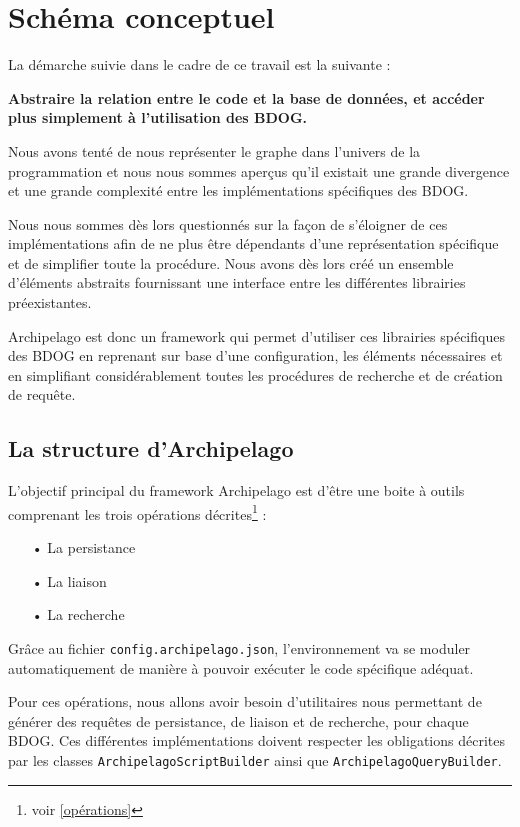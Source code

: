 \documentclass[a4paper,fleqn,12pt,oneside]{book}
\begin{document}

\newpage


\section{Schéma conceptuel}

La démarche suivie dans le cadre de ce travail est la suivante :

\begin{center}
\textbf{Abstraire la relation entre le code et la base de données, et accéder plus simplement à l’utilisation des BDOG. }
\end{center} 

Nous avons tenté de nous représenter le graphe dans l'univers de la programmation et nous nous sommes aperçus qu'il existait une grande divergence et une grande complexité entre les implémentations spécifiques des BDOG.

Nous nous sommes dès lors questionnés sur la façon de s'éloigner de ces implémentations afin de ne plus être dépendants d'une représentation spécifique et de simplifier toute la procédure. Nous avons dès lors créé un ensemble d'éléments abstraits fournissant une interface entre les différentes librairies préexistantes.

Archipelago est donc un framework qui permet d'utiliser ces librairies spécifiques des BDOG en reprenant sur base d’une configuration, les éléments nécessaires et en simplifiant considérablement toutes les procédures de recherche et de création de requête.
\subsection{La structure d'Archipelago}

L'objectif principal du framework Archipelago est d'être une boite à outils comprenant les trois opérations décrites\footnote{voir \ref{opérations}} :
\begin{itemize}
\item[•] La persistance
\item[•] La liaison
\item[•] La recherche
\end{itemize}

Grâce au fichier \texttt{config.archipelago.json}, l'environnement va se moduler automatiquement de manière à pouvoir exécuter le code spécifique adéquat.

Pour ces opérations, nous allons avoir besoin d'utilitaires nous permettant de générer des requêtes de persistance, de liaison et de recherche, pour chaque BDOG. Ces différentes implémentations doivent respecter les obligations décrites par les classes \texttt{ArchipelagoScriptBuilder} ainsi que \texttt{ArchipelagoQueryBuilder}.
\end{document}
